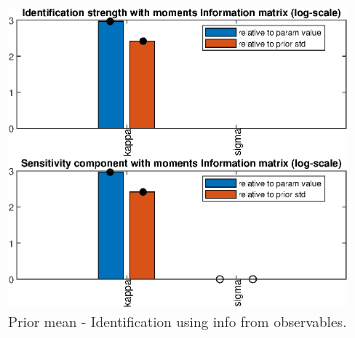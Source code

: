 
\begin{figure}[H]
\centering 
\includegraphics[width=0.8\textwidth]{MS/identification/MS_ident_strength_prior_mean}
\caption{Prior mean  - Identification using info from observables.}\label{Fig:ident:prior_mean}
\end{figure}

